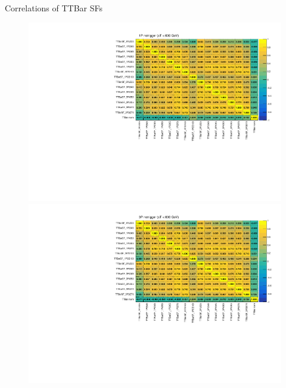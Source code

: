 \documentclass[aspectratio=46, dvipdfmx, 10pt, t]{beamer} %
\begin{document}
\begin{frame}{Correlations of TTBar SFs}
  \vspace{15mm}
  \begin{figure}
    \setcounter{subfigure}{0}
    \centering
        \includegraphics[scale=0.29]{correlation_sf_1P_notrigger_CR0}
        \includegraphics[scale=0.29]{correlation_sf_3P_notrigger_CR0}
  \end{figure}
\end{frame}
\end{document}
